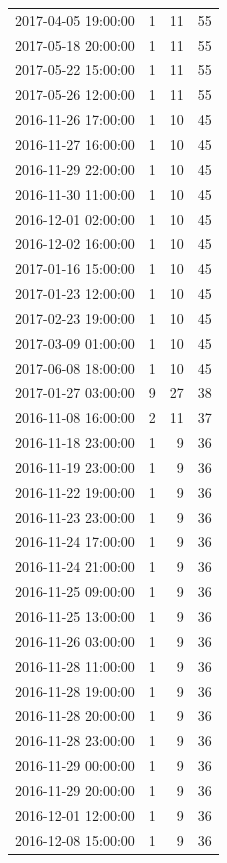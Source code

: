 \begin{tabular}{lrrr}
2017-04-05 19:00:00 & 1 & 11 & 55 \\
2017-05-18 20:00:00 & 1 & 11 & 55 \\
2017-05-22 15:00:00 & 1 & 11 & 55 \\
2017-05-26 12:00:00 & 1 & 11 & 55 \\
2016-11-26 17:00:00 & 1 & 10 & 45 \\
2016-11-27 16:00:00 & 1 & 10 & 45 \\
2016-11-29 22:00:00 & 1 & 10 & 45 \\
2016-11-30 11:00:00 & 1 & 10 & 45 \\
2016-12-01 02:00:00 & 1 & 10 & 45 \\
2016-12-02 16:00:00 & 1 & 10 & 45 \\
2017-01-16 15:00:00 & 1 & 10 & 45 \\
2017-01-23 12:00:00 & 1 & 10 & 45 \\
2017-02-23 19:00:00 & 1 & 10 & 45 \\
2017-03-09 01:00:00 & 1 & 10 & 45 \\
2017-06-08 18:00:00 & 1 & 10 & 45 \\
2017-01-27 03:00:00 & 9 & 27 & 38 \\
2016-11-08 16:00:00 & 2 & 11 & 37 \\
2016-11-18 23:00:00 & 1 & 9 & 36 \\
2016-11-19 23:00:00 & 1 & 9 & 36 \\
2016-11-22 19:00:00 & 1 & 9 & 36 \\
2016-11-23 23:00:00 & 1 & 9 & 36 \\
2016-11-24 17:00:00 & 1 & 9 & 36 \\
2016-11-24 21:00:00 & 1 & 9 & 36 \\
2016-11-25 09:00:00 & 1 & 9 & 36 \\
2016-11-25 13:00:00 & 1 & 9 & 36 \\
2016-11-26 03:00:00 & 1 & 9 & 36 \\
2016-11-28 11:00:00 & 1 & 9 & 36 \\
2016-11-28 19:00:00 & 1 & 9 & 36 \\
2016-11-28 20:00:00 & 1 & 9 & 36 \\
2016-11-28 23:00:00 & 1 & 9 & 36 \\
2016-11-29 00:00:00 & 1 & 9 & 36 \\
2016-11-29 20:00:00 & 1 & 9 & 36 \\
2016-12-01 12:00:00 & 1 & 9 & 36 \\
2016-12-08 15:00:00 & 1 & 9 & 36 \\

\end{tabular}
